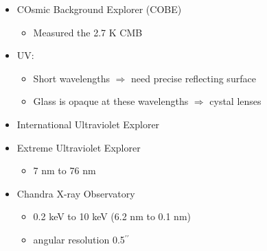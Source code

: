 \documentclass[12pt]{article}
\begin{document}
\begin{itemize}
\begin{itemize}
\item COsmic Background Explorer (COBE)
\begin{itemize}
\item Measured the 2.7 K CMB
\end{itemize}
\item UV:
\begin{itemize}
\item Short wavelengths $\Longrightarrow$ need precise reflecting surface
\item Glass is opaque at these wavelengths $\Longrightarrow$ cystal lenses
\end{itemize}
\item International Ultraviolet Explorer
\item Extreme Ultraviolet Explorer
\begin{itemize}
\item 7 nm to 76 nm
\end{itemize}
\item Chandra X-ray Observatory
\begin{itemize}
\item 0.2 keV to 10 keV (6.2 nm to 0.1 nm)
\item angular resolution 0.5$^{\prime\prime}$	
\end{itemize}
\end{itemize}
\end{itemize}
\end{document}
